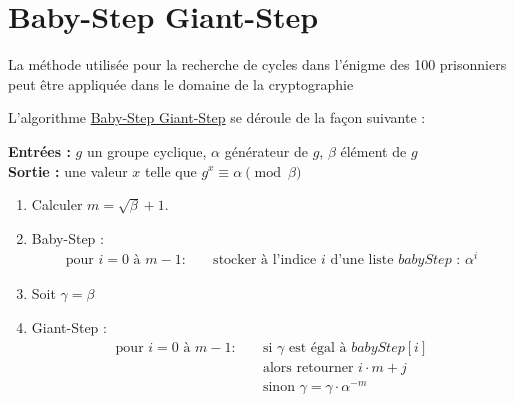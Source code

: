 \section{Baby-Step Giant-Step}

La méthode utilisée pour la recherche de cycles dans l'énigme des 100 prisonniers peut
être appliquée dans le domaine de la cryptographie

L'algorithme \href{https://fr.wikipedia.org/wiki/Baby-step_giant-step}{Baby-Step Giant-Step}
se déroule de la façon suivante : 

\begin{tcolorbox}[title=Algorithme Baby-Step Giant-Step]
    \textbf{Entrées :} $g$ un groupe cyclique, $\alpha$ générateur de $g$, $\beta$ élément de $g$ \\
    \textbf{Sortie :} une valeur $x$ telle que $g^x \equiv \alpha \pmod{\beta}$

    \begin{enumerate}
        \item  Calculer $m = \sqrt{\beta} +1$.
        \item Baby-Step :
              \[
                \begin{aligned}
                    \text{pour } i = 0 \text{ à } m-1: \quad & \text{stocker à l'indice $i$ d'une liste $babyStep$ : } \alpha^i
                \end{aligned}
              \]
        \item Soit $\gamma = \beta$
        \item Giant-Step :
              \[
                \begin{aligned}
                    \text{pour } i = 0 \text{ à } m-1: \quad & \text{si } \gamma \text{ est égal à } babyStep[i] \\
                                                             & \text{alors retourner } i \cdot m + j \\
                                                             & \text{sinon } \gamma = \gamma \cdot \alpha^{-m}
                \end{aligned}
              \]
    \end{enumerate}

\end{tcolorbox}